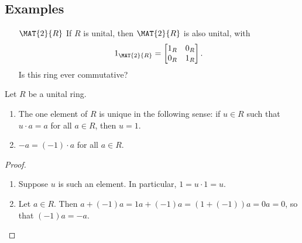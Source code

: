\documentclass{article}
\begin{document}
\subsection*{Examples}

\begin{itemize}
\item[$\MAT{2}{R}$] If $R$ is unital, then $\MAT{2}{R}$ is also unital, with \[ 1_{\MAT{2}{R}} = \begin{bmatrix} 1_R & 0_R \\ 0_R & 1_R \end{bmatrix}. \] Is this ring ever commutative?
\end{itemize}

\begin{center}
\end{center}

\begin{prop}
Let $R$ be a unital ring.
\begin{enumerate}
\item The one element of $R$ is unique in the following sense: if $u \in R$ such that $u \cdot a = a$ for all $a \in R$, then $u = 1$.
\item $-a = (-1) \cdot a$ for all $a \in R$.
\end{enumerate}
\end{prop}

\begin{proof} \mbox{}
\begin{enumerate}
\item Suppose $u$ is such an element. In particular, $1 = u \cdot 1 = u$.
\item Let $a \in R$. Then $a + (-1)a = 1a + (-1)a = (1 + (-1))a = 0a = 0$, so that $(-1)a = -a$. \qedhere
\end{enumerate}
\end{proof}
\end{document}
